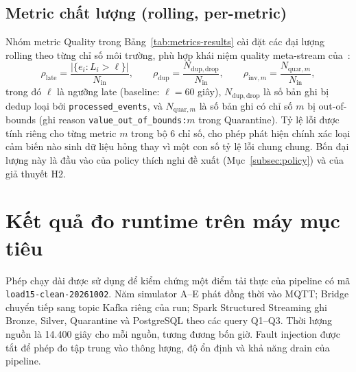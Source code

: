 \subsection{Metric chất lượng (rolling, per-metric)}
\label{subsec:quality-metrics}

Nhóm metric Quality trong Bảng~\ref{tab:metrics-results} cài đặt các đại lượng rolling
theo từng chỉ số môi trường, phù hợp khái niệm quality meta-stream
của~\cite{stream_daq_2024}:
\begin{equation}
  \rho_{\mathrm{late}} = \frac{|\{e_i : L_i > \ell\}|}{N_{\mathrm{in}}},
  \qquad
  \rho_{\mathrm{dup}} = \frac{N_{\mathrm{dup,drop}}}{N_{\mathrm{in}}},
  \qquad
  \rho_{\mathrm{inv},m} = \frac{N_{\mathrm{quar},m}}{N_{\mathrm{in}}},
  \label{eq:quality-ratios}
\end{equation}
trong đó $\ell$ là ngưỡng late (baseline: $\ell = 60$ giây),
$N_{\mathrm{dup,drop}}$ là số bản ghi bị dedup loại bởi
\texttt{processed\_events}, và $N_{\mathrm{quar},m}$ là số bản ghi có chỉ số
$m$ bị out-of-bounds (ghi reason \texttt{value\_out\_of\_bounds:$m$} trong
Quarantine). Tỷ lệ lỗi được tính riêng cho từng metric $m$ trong bộ 6 chỉ số,
cho phép phát hiện chính xác loại cảm biến nào sinh dữ liệu hỏng thay vì một
con số tỷ lệ lỗi chung chung. Bốn đại lượng này là đầu vào của policy thích
nghi đề xuất (Mục~\ref{subsec:policy}) và của giả thuyết H2.

\section{Kết quả đo runtime trên máy mục tiêu}
\label{sec:measured-runtime}

Phép chạy dài được sử dụng để kiểm chứng một điểm tải thực của pipeline có
mã \texttt{load15-clean-20261002}. Năm simulator A--E phát đồng thời vào
MQTT; Bridge chuyển tiếp sang topic Kafka riêng của run; Spark Structured
Streaming ghi Bronze, Silver, Quarantine và PostgreSQL theo các query Q1--Q3.
Thời lượng nguồn là 14.400 giây cho mỗi nguồn, tương đương bốn giờ. Fault
injection được tắt để phép đo tập trung vào thông lượng, độ ổn định và khả
năng drain của pipeline.

